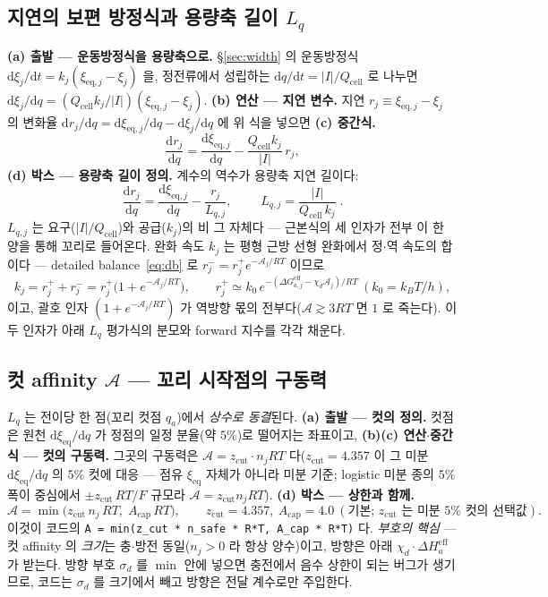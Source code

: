 \documentclass[11pt,a4paper]{article}
\newcommand{\dd}{\mathrm{d}}
\newcommand{\eff}{\mathrm{eff}}
\newcommand{\eq}{\mathrm{eq}}
\newcommand{\cell}{\mathrm{cell}}
\newcommand{\code}[1]{\texttt{#1}}
\begin{document}
\subsection{지연의 보편 방정식과 용량축 길이 $L_q$}
\textbf{(a) 출발 — 운동방정식을 용량축으로.} \S\ref{sec:width} 의 운동방정식 $\dd\xi_j/\dd t=k_j(\xi_{\eq,j}-\xi_j)$
을, 정전류에서 성립하는 $\dd q/\dd t=|I|/Q_\cell$ 로 나누면 $\dd\xi_j/\dd q=(Q_\cell k_j/|I|)(\xi_{\eq,j}-\xi_j)$.
\textbf{(b) 연산 — 지연 변수.} 지연 $r_j\equiv\xi_{\eq,j}-\xi_j$ 의 변화율 $\dd r_j/\dd q=\dd\xi_{\eq,j}/\dd q-\dd\xi_j/\dd q$
에 위 식을 넣으면 \textbf{(c) 중간식.}
\begin{equation}
\frac{\dd r_j}{\dd q}=\frac{\dd\xi_{\eq,j}}{\dd q}-\frac{Q_\cell k_j}{|I|}\,r_j,
\label{eq:Lqmid}
\end{equation}
\textbf{(d) 박스 — 용량축 길이 정의.} 계수의 역수가 용량축 지연 길이다:
\begin{equation}
\frac{\dd r_j}{\dd q}=\frac{\dd\xi_{\eq,j}}{\dd q}-\frac{r_j}{L_{q,j}},
\qquad \boxed{\;L_{q,j}=\frac{|I|}{Q_\cell\,k_j}\;.}
\label{eq:Lq}
\end{equation}
$L_{q,j}$ 는 요구($|I|/Q_\cell$)와 공급($k_j$)의 비 그 자체다 — 근본식의 세 인자가 전부 이 한 양을 통해 꼬리로
들어온다. 완화 속도 $k_j$ 는 평형 근방 선형 완화에서 정$\cdot$역 속도의 합이다 — detailed balance~\eqref{eq:db} 로
$r_j^-=r_j^+e^{-\mathcal A_j/RT}$ 이므로
\begin{equation}
k_j=r_j^++r_j^-=r_j^+\big(1+e^{-\mathcal A_j/RT}\big),
\qquad r_j^+\simeq k_0\,e^{-(\Delta G_{a,j}^\eff-\chi_d\mathcal A_j)/RT}\ (k_0=k_BT/h),
\label{eq:kuniv}
\end{equation}
이고, 괄호 인자 $(1+e^{-\mathcal A_j/RT})$ 가 역방향 몫의 전부다($\mathcal A\gtrsim3RT$ 면 $1$ 로 죽는다). 이 두 인자가
아래 $L_q$ 평가식의 분모와 forward 지수를 각각 채운다.

\subsection{컷 affinity $\mathcal A$ — 꼬리 시작점의 구동력}
$L_q$ 는 전이당 한 점(꼬리 컷점 $q_a$)에서 \emph{상수로 동결}된다. \textbf{(a) 출발 — 컷의 정의.} 컷점은 원천
$\dd\xi_\eq/\dd q$ 가 정점의 일정 분율(약 $5\%$)로 떨어지는 좌표이고, \textbf{(b)(c) 연산$\cdot$중간식 — 컷의 구동력.}
그곳의 구동력은 $\mathcal A=z_\mathrm{cut}\cdot n_jRT$ 다($z_\mathrm{cut}=4.357$ 이 그 미분 $\dd\xi_\eq/\dd q$ 의 $5\%$
컷에 대응 — 점유 $\xi_\eq$ 자체가 아니라 미분 기준; logistic 미분 종의 $5\%$ 폭이 중심에서 $\pm z_\mathrm{cut}\,RT/F$
규모라 $\mathcal A=z_\mathrm{cut}n_jRT$). \textbf{(d) 박스 — 상한과 함께.}
\begin{equation}
\mathcal A=\min\!\big(z_\mathrm{cut}\,n_j\,RT,\;A_\mathrm{cap}\,RT\big),
\qquad z_\mathrm{cut}=4.357,\ A_\mathrm{cap}=4.0\ (\text{기본; }z_\mathrm{cut}\text{ 는 미분 }5\%\text{ 컷의 선택값}).
\label{eq:Acut}
\end{equation}
이것이 코드의 \code{A = min(z\_cut * n\_safe * R*T, A\_cap * R*T)} 다. \emph{부호의 핵심} — 컷 affinity 의 \emph{크기}는
충$\cdot$방전 동일($n_j>0$ 라 항상 양수)이고, 방향은 아래 $\chi_d\cdot\Delta H_a^\eff$ 가 받는다. 방향 부호 $\sigma_d$ 를
$\min$ 안에 넣으면 충전에서 음수 상한이 되는 버그가 생기므로, 코드는 $\sigma_d$ 를 크기에서 빼고 방향은 전달 계수로만
주입한다.
\end{document}
